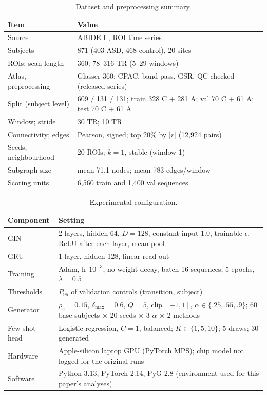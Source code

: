 \documentclass[conference]{IEEEtran}
\begin{document}
\begin{table}[!tbp]
\caption{Dataset and preprocessing summary.}
\label{tab:data}
\centering\footnotesize
\begin{tabular}{@{}p{2.9cm}p{5.05cm}@{}}
\toprule
Item & Value \\
\midrule
Source & ABIDE I \cite{dimartino2014}, ROI time series \\
Subjects & 871 (403 ASD, 468 control), 20 sites \\
ROIs; scan length & 360; 78--316 TR (5--29 windows) \\
Atlas, preprocessing & Glasser 360; CPAC, band-pass, GSR, QC-checked (released series) \\
Split (subject level) & 609 / 131 / 131; train 328 C + 281 A; val 70 C + 61 A; test 70 C + 61 A \\
Window; stride & 30 TR; 10 TR \\
Connectivity; edges & Pearson, signed; top 20\% by $|r|$ (12,924 pairs) \\
Seeds; neighbourhood & 20 ROIs; $k{=}1$, stable (window 1) \\
Subgraph size & mean 71.1 nodes; mean 783 edges/window \\
Scoring units & 6,560 train and 1,400 val sequences \\
\bottomrule
\end{tabular}
\end{table}

\begin{table}[!tbp]
\caption{Experimental configuration.}
\label{tab:config}
\centering\footnotesize
\begin{tabular}{@{}p{2.1cm}p{5.85cm}@{}}
\toprule
Component & Setting \\
\midrule
GIN & 2 layers, hidden 64, $D{=}128$, constant input 1.0, trainable $\epsilon$, ReLU after each layer, mean pool \\
GRU & 1 layer, hidden 128, linear read-out \\
Training & Adam, lr $10^{-3}$, no weight decay, batch 16 sequences, 5 epochs, $\lambda{=}0.5$ \\
Thresholds & $P_{95}$ of validation controls (transition, subject) \\
Generator & $\rho_e{=}0.15$, $\delta_{\max}{=}0.6$, $Q{=}5$, clip $[-1,1]$, $\alpha\in\{.25,.55,.9\}$; 60 base subjects $\times$ 20 seeds $\times$ 3 $\alpha$ $\times$ 2 methods \\
Few-shot head & Logistic regression, $C{=}1$, balanced; $K\in\{1,5,10\}$; 5 draws; 30 generated \\
Hardware & Apple-silicon laptop GPU (PyTorch MPS); chip model not logged for the original runs \\
Software & Python 3.13, PyTorch 2.14, PyG 2.8 (environment used for this paper's analyses) \\
\bottomrule
\end{tabular}
\end{table}
\end{document}
